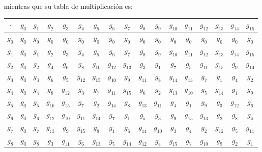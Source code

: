 \documentclass[letterpaper,10pt]{article}
\begin{document}
\begin{enumerate}
    \newpage
    mientras que su tabla de multiplicación es:
    \begin{table}[h]
    \begin{center}
    \begin{tabular}{|c|c|c|c|c|c|c|c|c|c|c|c|c|c|c|c|c|}
    \hline
    $\cdot$ & $g_{0}$ & $g_{1}$ & $g_{2}$ & $g_{3}$ & $g_{4}$ &
    $g_{5}$ & $g_{6}$ & $g_{7}$ & $g_{8}$ & $g_{9}$ & 
    $g_{10}$ & $g_{11}$ & $g_{12}$ & $g_{13}$ & $g_{14}$ & 
    $g_{15}$ \\ \hline
    $g_{0}$ & $g_{0}$ & $g_{0}$ & $g_{0}$ & $g_{0}$ & 
    $g_{0}$ & $g_{0}$ & $g_{0}$ & $g_{0}$ & $g_{0}$ & $g_{0}$  
    & $g_{0}$ & $g_{0}$ & $g_{0}$ & $g_{0}$ & $g_{0}$ & 
    $g_{0}$ \\ \hline
    $g_{1}$ & $g_{0}$ & $g_{1}$ & $g_{2}$ & $g_{3}$ & 
    $g_{4}$ & $g_{5}$ & $g_{6}$ & $g_{7}$ & $g_{8}$ & 
    $g_{9}$ & $g_{10}$ & $g_{11}$ & $g_{12}$ & $g_{13}$ & 
    $g_{14}$ & $g_{15}$ \\ \hline
    $g_{2}$ & $g_{0}$ & $g_{2}$ & $g_{4}$ & $g_{6}$ & $g_{8}$ & $g_{10}$ & 
    $g_{12}$ & $g_{13}$ & $g_{3}$ & $g_{1}$ & $g_{7}$ & $g_{5}$ & $g_{11}$ & 
    $g_{15}$& $g_{9}$ & $g_{14}$ \\ \hline
    $g_{3}$ & $g_{0}$ & $g_{3}$ & $g_{6}$ & $g_{5}$ & $g_{12}$ & $g_{15}$ & 
    $g_{10}$ & $g_{9}$ & $g_{11}$ & $g_{8}$ & $g_{14}$ & $g_{13}$ & $g_{7}$ & 
    $g_{1}$ & $g_{4}$ & $g_{2}$ \\ \hline
    $g_{4}$ & $g_{0}$ & $g_{4}$ & $g_{8}$ & $g_{12}$ & $g_{3}$ & $g_{7}$ & 
    $g_{11}$ & $g_{15}$ & $g_{6}$ & $g_{2}$ & $g_{13}$ & $g_{10}$ & $g_{5}$ & 
    $g_{14}$ & $g_{1}$ & $g_{9}$ \\ \hline
    $g_{5}$ & $g_{0}$ & $g_{5}$ & $g_{10}$ & $g_{15}$ & $g_{7}$ & $g_{2}$ & 
    $g_{14}$ & $g_{8}$ & $g_{13}$ & $g_{11}$ & $g_{4}$ & $g_{1}$ & $g_{9}$ & 
    $g_{3}$ & $g_{12}$ & $g_{6}$ \\\hline
    $g_{6}$ & $g_{0}$ & $g_{6}$ & $g_{12}$ & $g_{10}$ & $g_{11}$ & $g_{14}$ & 
    $g_{7}$ & $g_{1}$ & $g_{5}$ & $g_{3}$ & $g_{9}$ & $g_{15}$ & $g_{13}$ & 
    $g_{2}$ & $g_{8}$ & $g_{4}$ \\\hline
    $g_{7}$ & $g_{0}$ & $g_{7}$ & $g_{13}$ & $g_{9}$ & $g_{15}$ & $g_{8}$ & 
    $g_{1}$ & $g_{6}$ & $g_{14}$ & $g_{10}$ & $g_{3}$ & $g_{4}$ & $g_{2}$ & 
    $g_{12}$ & $g_{5}$ & $g_{11}$ \\\hline
    $g_{8}$ & $g_{0}$ & $g_{8}$ & $g_{3}$ & $g_{11}$ & $g_{6}$ & $g_{13}$ & 
    $g_{5}$ & $g_{14}$ & $g_{12}$ & $g_{4}$ & $g_{15}$ & $g_{7}$ & $g_{10}$ & 
    $g_{9}$ & $g_{2}$ & $g_{1}$ \\ \hline

\end{tabular}
\end{center}
\end{table}
\end{enumerate}
\end{document}
